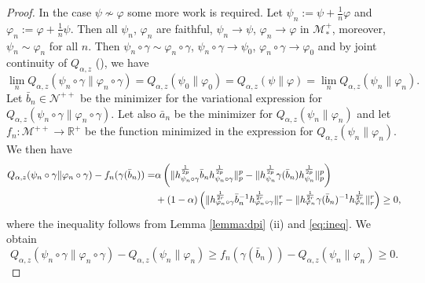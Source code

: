 \documentclass[12pt]{article}
\theoremstyle{definition}
\theoremstyle{remark}
\numberwithin{equation}{section}
\def\Me{\mathcal M}
\def\Ne{\mathcal N}
\def\ffi{\varphi}
\begin{document}
\begin{proof}
 In the case $\psi\not\sim \ffi$ some more work is required. Let $\psi_n:=\psi+\frac1n \ffi$ and $\ffi_n:=\ffi+\frac1n \psi$.
 Then all $\psi_n$, $\ffi_n$ are faithful,  $\psi_n\to \psi$,  $\ffi_n\to \ffi$ in $\Me_*^+$,
moreover,  $\psi_n\sim \ffi_n$ for
all $n$. Then $\psi_n\circ\gamma\sim \ffi_n\circ\gamma$, $\psi_n\circ\gamma\to \psi_0$,
$\ffi_n \circ \gamma\to \ffi_0$ and by joint continuity of $Q_{\alpha,z}$ (\cite[Thm. 1 (iv)]{kato2023onrenyi}), we have
\[
\lim_n
Q_{\alpha,z}(\psi_n\circ\gamma\|\ffi_n\circ\gamma)=Q_{\alpha,z}(\psi_0\|\ffi_0)=Q_{\alpha,z}(\psi\|\ffi)=\lim_n
Q_{\alpha,z}(\psi_n\|\ffi_n).
\]
Let $\bar b_{n}\in \Ne^{++}$ be the minimizer for the variational expression for
$Q_{\alpha,z}(\psi_n\circ\gamma\|\ffi_n\circ\gamma)$. Let also $\bar a_n$ be the minimizer
for $Q_{\alpha,z}(\psi_n\|\ffi_n)$ and let $f_n:\Me^{++}\to \mathbb R^+$
be the function minimized in the expression for $Q_{\alpha,z}(\psi_n\|\ffi_n)$. 
We then have 
\begin{align*}
Q_{\alpha,z}(\psi_n\circ\gamma\|\ffi_n\circ\gamma)-f_n(\gamma(\bar
b_{n}))=&\alpha\left(\|h_{\psi_n\circ\gamma}^{\frac1{2p}}\bar b_{n}
h_{\psi_n\circ\gamma}^{\frac1{2p}}\|_p^p-\|h_{\psi_n}^{1\over 2p}\gamma(\bar
b_n)h_{\psi_n}^{1\over 2p}\|_p^p\right)\\
& + (1-\alpha)\left(\|h_{\ffi_n\circ\gamma}^{\frac1{2r}}\bar b_{n}^{-1}
h_{\ffi_n\circ\gamma}^{\frac1{2r}}\|_r^r-\|h_{\ffi_n}^{1\over 2r}\gamma(\bar
b_n)^{-1}h_{\ffi_n}^{1\over 2r}\|_r^r\right)\ge 0,
\end{align*}
where the inequality follows from Lemma \ref{lemma:dpi} (ii) and \eqref{eq:ineq}. We
obtain
\begin{equation}\label{eq:qfn}
Q_{\alpha,z}(\psi_n\circ\gamma\|\ffi_n\circ\gamma)-Q_{\alpha,z}(\psi_n\|\ffi_n)\ge f_n(\gamma(\bar
b_{n}))-Q_{\alpha,z}(\psi_n\|\ffi_n)\ge 0.
\end{equation}


\end{proof}
\end{document}
